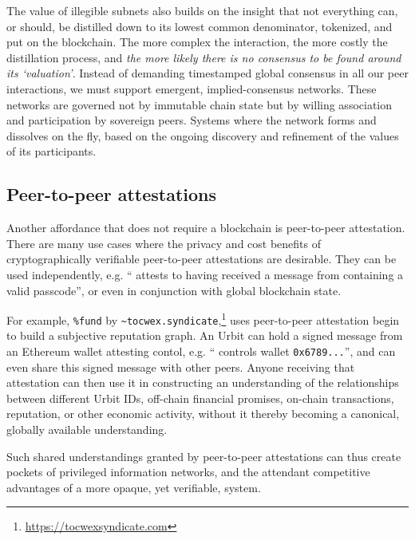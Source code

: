 \documentclass[twoside]{article}
\begin{document}
The value of illegible subnets also builds on the insight that not everything can, or should, be distilled down to its lowest common denominator, tokenized, and put on the blockchain. The more complex the interaction, the more costly the distillation process, and \emph{the more likely there is no consensus to be found around its `valuation'}. Instead of demanding timestamped global consensus in all our peer interactions, we must support emergent, implied-consensus networks. These networks are governed not by immutable chain state but by willing association and participation by sovereign peers. Systems where the network forms and dissolves on the fly, based on the ongoing discovery and refinement of the values of its participants.

\subsection{Peer-to-peer attestations}

Another affordance that does not require a blockchain is peer-to-peer attestation. There are many use cases where the privacy and cost benefits of cryptographically verifiable peer-to-peer attestations are desirable. They can be used independently, e.g. `` attests to having received a message from  containing a valid passcode'', or even in conjunction with global blockchain state.

\sloppy
For example, \lstinline[style=inlinecode]{%fund} by \lstinline[style=inlinecode]{~tocwex.syndicate},\footnote{\url{https://tocwexsyndicate.com}} uses peer-to-peer attestation begin to build a subjective reputation graph. An Urbit can hold a signed message from an Ethereum wallet attesting contol, e.g. `` controls wallet \lstinline[style=inlinecode]{0x6789...}'', and can even share this signed message with other peers. Anyone receiving that attestation can then use it in constructing an understanding of the relationships between different Urbit IDs, off-chain financial promises, on-chain transactions, reputation, or other economic activity, without it thereby becoming a canonical, globally available understanding.


Such shared understandings granted by peer-to-peer attestations can thus create pockets of privileged information networks, and the attendant competitive advantages of a more opaque, yet verifiable, system.
\end{document}
